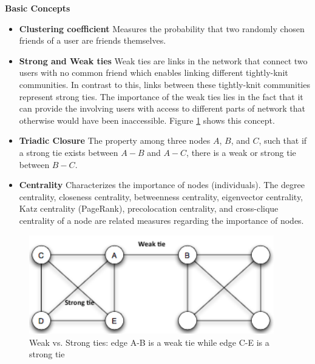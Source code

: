 \documentclass[11pt,a4paper]{article}
\begin{document}
\textbf{Basic Concepts}

\begin{itemize}
\item \textbf{Clustering coefficient} Measures the probability that two randomly chosen friends of a user are friends themselves.
\item \textbf{Strong and Weak ties} Weak ties are links in the network that connect two users with no common friend which enables linking different tightly-knit communities. In contrast to this, links between these tightly-knit communities represent strong ties. The importance of the weak ties lies in the fact that it can provide the involving users with access to different parts of network that otherwise would have been inaccessible. Figure \ref{fig:figA} shows this concept. 
\item \textbf{Triadic Closure} The property among three nodes $A$, $B$, and $C$, such that if a strong tie exists between $A-B$ and $A-C$, there is a weak or strong tie between $B-C$. %
\item \textbf{Centrality} Characterizes the importance of nodes (individuals). The degree centrality, closeness centrality, betweenness centrality, eigenvector centrality, Katz centrality (PageRank), precolocation centrality, and cross-clique centrality of a node are related measures regarding the importance of nodes.
\end{itemize}
\begin{figure}[h]
\begin{center}
\includegraphics[width=0.95\textwidth]{weakStrongTies.png}
\end{center}
\caption{Weak vs. Strong ties: edge A-B is a weak tie while edge C-E is a strong tie}
\label{fig:figA}
\end{figure}
\end{document}
